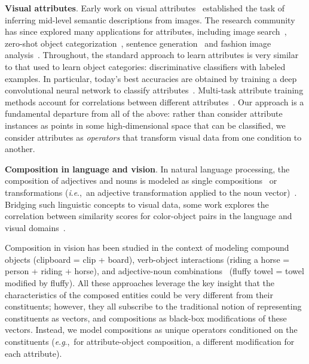 \documentclass[runningheads]{llncs}
\newcommand{\ie}{\textit{i}.\textit{e}.,~}
\newcommand{\eg}{\textit{e}.\textit{g}.,~}
\begin{document}
\noindent\textbf{Visual attributes}. 
Early work on visual attributes~\cite{facetracer,lampert-cvpr2009,farhadi-cvpr2009,relative-attributes} established the task of inferring mid-level semantic descriptions from images.  The research community has since explored many applications for attributes, including image search~\cite{facetracer,whittle-search,siddiquie-feris-cvpr2011}, zero-shot object categorization~\cite{lampert-cvpr2009,dinesh-nips2014,ziad-cvpr2016}, sentence generation~\cite{baby-talk} and fashion image analysis~\cite{tamara-eccv2010,huang-iccv2015,kimberly-iccv2017}.  Throughout, the standard approach to learn attributes is very similar to that used to learn object categories: discriminative classifiers with labeled examples.  In particular, today's best accuracies are obtained by training a deep convolutional neural network to classify attributes~\cite{walk-learn-cvpr2016,face-attributes-iccv2015,yongjae-stn,lu-feris-cvpr2017,su-eccv2016}.  Multi-task attribute training methods account for correlations between different attributes~\cite{lu-feris-cvpr2017,dinesh-cvpr2014,elhoseiny-cvpr2015,siddiquie-feris-cvpr2011}.  Our approach is a fundamental departure from all of the above: rather than consider attribute instances as points in some high-dimensional space that can be classified, we consider attributes as \emph{operators} that transform visual data from one condition to another.

\vspace{0.05in}
\noindent \textbf{Composition in language and vision}.  
In natural language processing, the composition of adjectives and nouns is modeled as single compositions~\cite{guevara2010regression,mitchell2008vector} or transformations (\ie an adjective transformation applied to the noun vector)~\cite{baroni2010nouns,socher2013recursive}.  Bridging such linguistic concepts to visual data, some work explores the correlation between similarity scores for color-object pairs in the language and visual domains~\cite{nguyen2014coloring}. 

Composition in vision has been studied in the context of modeling compound objects \cite{pezzelle2016building} (clipboard = clip + board), verb-object interactions \cite{sadeghi2011recognition,zhang2017visual} (riding a horse = person + riding + horse), and adjective-noun combinations~\cite{chen2014inferring,misra2017red,cruz2018neural} (fluffy towel = towel modified by fluffy).
All these approaches leverage the key insight that the characteristics of the composed entities could be very different from their constituents; however, they all subscribe to the traditional notion of representing constituents as vectors, and compositions as black-box modifications of these vectors. Instead, we model compositions as unique operators conditioned on the constituents (\eg for attribute-object composition, a different modification for each attribute).
\end{document}
